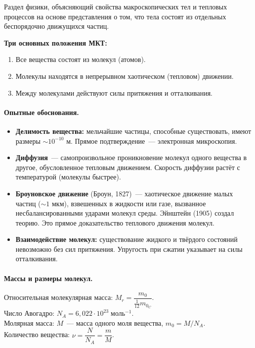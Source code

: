 \documentclass[12pt]{article}
\begin{document}
\begin{definition}
	Раздел физики, объясняющий свойства макроскопических тел и тепловых процессов на основе представления о том, что тела состоят из отдельных беспорядочно движущихся частиц.
\end{definition}

\textbf{Три основных положения МКТ:}
\begin{enumerate}
	\item Все вещества состоят из молекул (атомов).
	\item Молекулы находятся в непрерывном хаотическом (тепловом) движении.
	\item Между молекулами действуют силы притяжения и отталкивания.
\end{enumerate}

\paragraph{Опытные обоснования.}
\begin{itemize}
	\item \textbf{Делимость вещества:} мельчайшие частицы, способные существовать, имеют размеры $\sim 10^{-10}$ м. Прямое подтверждение~--- электронная микроскопия.
	\item \textbf{Диффузия}~--- самопроизвольное проникновение молекул одного вещества в другое, обусловленное тепловым движением. Скорость диффузии растёт с температурой (молекулы быстрее).
	\item \textbf{Броуновское движение} (Броун, 1827)~--- хаотическое движение малых частиц ($\sim 1$ мкм), взвешенных в жидкости или газе, вызванное несбалансированными ударами молекул среды. Эйнштейн (1905) создал теорию. Это прямое доказательство теплового движения молекул.
	\item \textbf{Взаимодействие молекул:} существование жидкого и твёрдого состояний невозможно без сил притяжения. Упругость при сжатии указывает на силы отталкивания.
\end{itemize}

\paragraph{Массы и размеры молекул.}
Относительная молекулярная масса: $M_r = \dfrac{m_0}{\frac{1}{12}m_{0_C}}$.\\
Число Авогадро: $N_A = 6{,}022 \cdot 10^{23} \; \text{моль}^{-1}$.\\
Молярная масса: $M$~--- масса одного моля вещества, $m_0 = M/N_A$.\\
Количество вещества: $\nu = \dfrac{N}{N_A} = \dfrac{m}{M}$.
\end{document}

